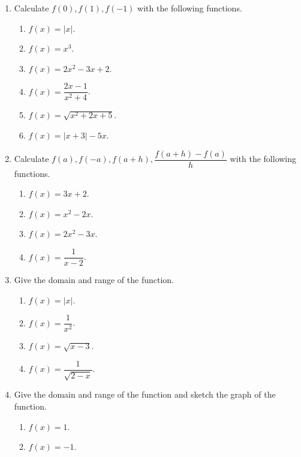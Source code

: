 \documentclass[11pt]{book}
\theoremstyle{break}
\theoremstyle{no_label}
\numberwithin{equation}{section}
\begin{document}
\begin{enumerate}[label=\arabic*.]
    \item Calculate $f(0), f(1), f(-1)$ with the following functions.
    \begin{multicols}{3}
        \begin{enumerate}
            \item $f(x)=|x|$.
            \item $f(x)=x^3$.
            \item $f(x)=2x^2-3x+2$.
            \item $f(x)=\dfrac{2x-1}{x^2+4}$.
            \item $f(x)=\sqrt{x^2+2x+5}$.
            \item $f(x)=|x+3|-5x$.
        \end{enumerate}
    \end{multicols}
    \item Calculate $f(a), f(-a), f(a+h), \dfrac{f(a+h)-f(a)}{h}$ with the following functions.
    \begin{multicols}{2}
        \begin{enumerate}
            \item $f(x)=3x+2$.
            \item $f(x)=x^2-2x$.
            \item $f(x)=2x^2-3x$.
            \item $f(x)=\dfrac{1}{x-2}$.
        \end{enumerate}
    \end{multicols}
    \item Give the domain and range of the function.
    \begin{multicols}{2}
        \begin{enumerate}
            \item $f(x)=|x|$.
            \item $f(x)=\dfrac{1}{x^2}$.
            \item $f(x)=\sqrt{x-3}$.
            \item $f(x)=\dfrac{1}{\sqrt{2-x}}$.
        \end{enumerate}
    \end{multicols}
    \item Give the domain and range of the function and sketch the graph of the function.
    \begin{multicols}{2}
        \begin{enumerate}
            \item $f(x)=1$.
            \item $f(x)=-1$.

\end{enumerate}
\end{multicols}
\end{enumerate}
\end{document}
